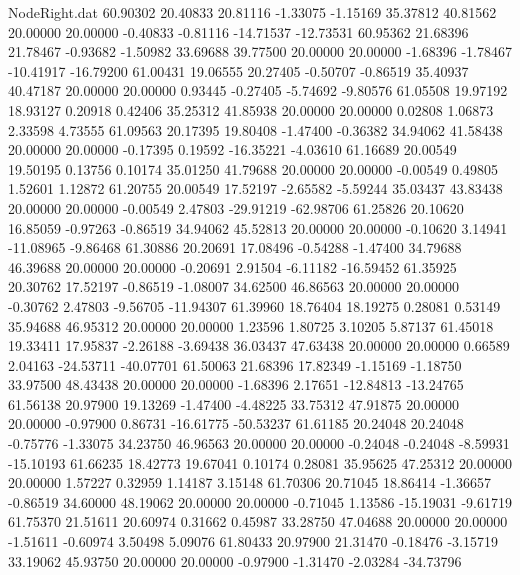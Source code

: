 \begin{filecontents}{NodeRight.dat}
  60.90302   20.40833   20.81116    -1.33075   -1.15169   35.37812   40.81562   20.00000   20.00000   -0.40833   -0.81116  -14.71537  -12.73531
  60.95362   21.68396   21.78467    -0.93682   -1.50982   33.69688   39.77500   20.00000   20.00000   -1.68396   -1.78467  -10.41917  -16.79200
  61.00431   19.06555   20.27405    -0.50707   -0.86519   35.40937   40.47187   20.00000   20.00000    0.93445   -0.27405   -5.74692   -9.80576
  61.05508   19.97192   18.93127     0.20918    0.42406   35.25312   41.85938   20.00000   20.00000    0.02808    1.06873    2.33598    4.73555
  61.09563   20.17395   19.80408    -1.47400   -0.36382   34.94062   41.58438   20.00000   20.00000   -0.17395    0.19592  -16.35221   -4.03610
  61.16689   20.00549   19.50195     0.13756    0.10174   35.01250   41.79688   20.00000   20.00000   -0.00549    0.49805    1.52601    1.12872
  61.20755   20.00549   17.52197    -2.65582   -5.59244   35.03437   43.83438   20.00000   20.00000   -0.00549    2.47803  -29.91219  -62.98706
  61.25826   20.10620   16.85059    -0.97263   -0.86519   34.94062   45.52813   20.00000   20.00000   -0.10620    3.14941  -11.08965   -9.86468
  61.30886   20.20691   17.08496    -0.54288   -1.47400   34.79688   46.39688   20.00000   20.00000   -0.20691    2.91504   -6.11182  -16.59452
  61.35925   20.30762   17.52197    -0.86519   -1.08007   34.62500   46.86563   20.00000   20.00000   -0.30762    2.47803   -9.56705  -11.94307
  61.39960   18.76404   18.19275     0.28081    0.53149   35.94688   46.95312   20.00000   20.00000    1.23596    1.80725    3.10205    5.87137
  61.45018   19.33411   17.95837    -2.26188   -3.69438   36.03437   47.63438   20.00000   20.00000    0.66589    2.04163  -24.53711  -40.07701
  61.50063   21.68396   17.82349    -1.15169   -1.18750   33.97500   48.43438   20.00000   20.00000   -1.68396    2.17651  -12.84813  -13.24765
  61.56138   20.97900   19.13269    -1.47400   -4.48225   33.75312   47.91875   20.00000   20.00000   -0.97900    0.86731  -16.61775  -50.53237
  61.61185   20.24048   20.24048    -0.75776   -1.33075   34.23750   46.96563   20.00000   20.00000   -0.24048   -0.24048   -8.59931  -15.10193
  61.66235   18.42773   19.67041     0.10174    0.28081   35.95625   47.25312   20.00000   20.00000    1.57227    0.32959    1.14187    3.15148
  61.70306   20.71045   18.86414    -1.36657   -0.86519   34.60000   48.19062   20.00000   20.00000   -0.71045    1.13586  -15.19031   -9.61719
  61.75370   21.51611   20.60974     0.31662    0.45987   33.28750   47.04688   20.00000   20.00000   -1.51611   -0.60974    3.50498    5.09076
  61.80433   20.97900   21.31470    -0.18476   -3.15719   33.19062   45.93750   20.00000   20.00000   -0.97900   -1.31470   -2.03284  -34.73796

\end{filecontents}
